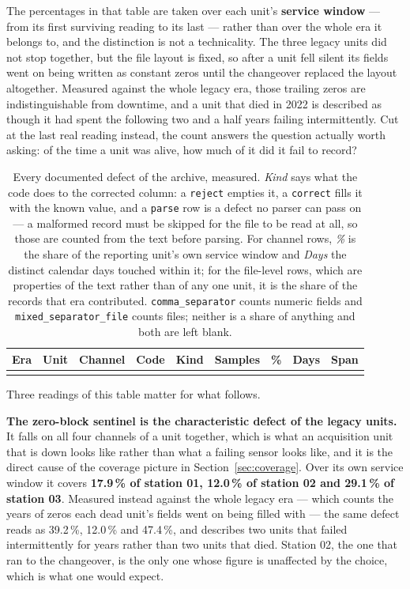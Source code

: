 \documentclass[11pt,a4paper]{article}
\begin{document}
The percentages in that table are taken over each unit's \textbf{service window} --- from its first surviving reading to its last --- rather than over the whole era it belongs to, and the distinction is not a technicality. The three legacy units did not stop together, but the file layout is fixed, so after a unit fell silent its fields went on being written as constant zeros until the changeover replaced the layout altogether. Measured against the whole legacy era, those trailing zeros are indistinguishable from downtime, and a unit that died in 2022 is described as though it had spent the following two and a half years failing intermittently. Cut at the last real reading instead, the count answers the question actually worth asking: of the time a unit was alive, how much of it did it fail to record?

\begin{table}[H]
\centering
\scriptsize
\setlength{\tabcolsep}{4pt}
\begin{tabular}{lllllR{1.3cm}R{0.9cm}R{0.8cm}l}
\toprule
\textbf{Era} & \textbf{Unit} & \textbf{Channel} & \textbf{Code} &
\textbf{Kind} & \textbf{Samples} & \textbf{\%} & \textbf{Days} & \textbf{Span} \\
\midrule

\\
\bottomrule
\end{tabular}
\caption{Every documented defect of the archive, measured. \emph{Kind} says what the code does to the corrected column: a \texttt{reject} empties it, a \texttt{correct} fills it with the known value, and a \texttt{parse} row is a defect no parser can pass on --- a malformed record must be skipped for the file to be read at all, so those are counted from the text before parsing. For channel rows, \emph{\%} is the share of the reporting unit's own service window and \emph{Days} the distinct calendar days touched within it; for the file-level rows, which are properties of the text rather than of any one unit, it is the share of the records that era contributed. \texttt{comma\_separator} counts numeric fields and \texttt{mixed\_separator\_file} counts files; neither is a share of anything and both are left blank.}
\label{tab:raw_census}
\end{table}

Three readings of this table matter for what follows.

\textbf{The zero-block sentinel is the characteristic defect of the legacy units.} It falls on all four channels of a unit together, which is what an acquisition unit that is down looks like rather than what a failing sensor looks like, and it is the direct cause of the coverage picture in Section~\ref{sec:coverage}. Over its own service window it covers \textbf{17.9\,\% of station 01, 12.0\,\% of station 02 and 29.1\,\% of station 03}. Measured instead against the whole legacy era --- which counts the years of zeros each dead unit's fields went on being filled with --- the same defect reads as 39.2\,\%, 12.0\,\% and 47.4\,\%, and describes two units that failed intermittently for years rather than two units that died. Station 02, the one that ran to the changeover, is the only one whose figure is unaffected by the choice, which is what one would expect.
\end{document}
